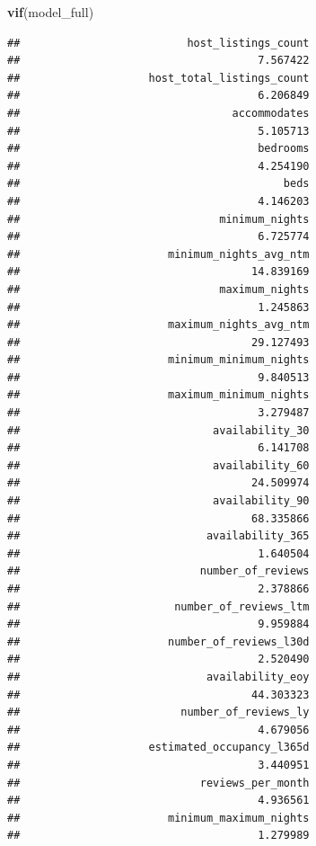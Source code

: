 \documentclass[
]{article}
\newenvironment{Shaded}{\begin{snugshade}}{\end{snugshade}}
\newcommand{\FunctionTok}[1]{\textcolor[rgb]{0.13,0.29,0.53}{\textbf{#1}}}
\newcommand{\NormalTok}[1]{#1}
\begin{document}
\begin{Shaded}
\begin{Highlighting}[]
\FunctionTok{vif}\NormalTok{(model\_full)}
\end{Highlighting}
\end{Shaded}

\begin{verbatim}
##                          host_listings_count 
##                                     7.567422 
##                    host_total_listings_count 
##                                     6.206849 
##                                 accommodates 
##                                     5.105713 
##                                     bedrooms 
##                                     4.254190 
##                                         beds 
##                                     4.146203 
##                               minimum_nights 
##                                     6.725774 
##                       minimum_nights_avg_ntm 
##                                    14.839169 
##                               maximum_nights 
##                                     1.245863 
##                       maximum_nights_avg_ntm 
##                                    29.127493 
##                       minimum_minimum_nights 
##                                     9.840513 
##                       maximum_minimum_nights 
##                                     3.279487 
##                              availability_30 
##                                     6.141708 
##                              availability_60 
##                                    24.509974 
##                              availability_90 
##                                    68.335866 
##                             availability_365 
##                                     1.640504 
##                            number_of_reviews 
##                                     2.378866 
##                        number_of_reviews_ltm 
##                                     9.959884 
##                       number_of_reviews_l30d 
##                                     2.520490 
##                             availability_eoy 
##                                    44.303323 
##                         number_of_reviews_ly 
##                                     4.679056 
##                    estimated_occupancy_l365d 
##                                     3.440951 
##                            reviews_per_month 
##                                     4.936561 
##                       minimum_maximum_nights 
##                                     1.279989 

\end{verbatim}
\end{document}
